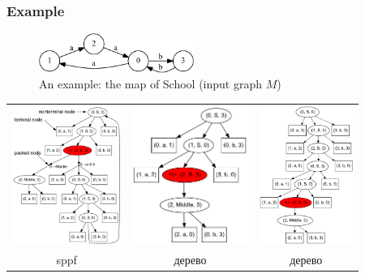 \documentclass{beamer}
\begin{document}
\begin{frame}
  \transwipe[direction=90]
  \frametitle{Example}
\begin{figure}[ht]
    \centering
        \includegraphics[width=0.45\textwidth]{pictures/input.pdf}
        \caption{An example: the map of School (input graph $M$)}
\end{figure}

\begin{tabular}{  c  c  c  }
      \includegraphics[height=4.5cm]{pictures/AnBn.pdf}
    &
      \includegraphics[height=4.5cm]{pictures/AnBn_2.pdf}
    &
      \includegraphics[height=4.5cm]{pictures/AnBn_1.pdf}

\\
sppf
& дерево
& дерево
  \end{tabular}
\end{frame}
\end{document}
